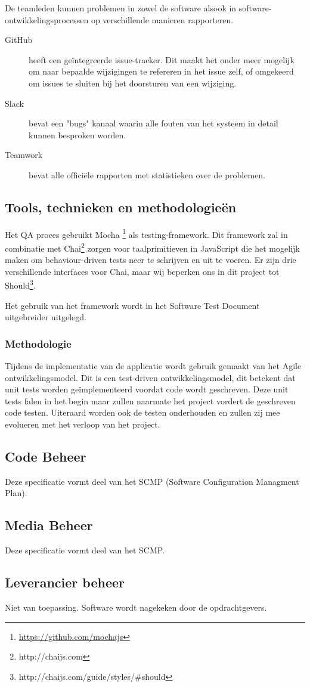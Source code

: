 De teamleden kunnen problemen in zowel de software alsook in software-ontwikkelingsprocessen op verschillende manieren rapporteren.
\begin{description}
\item[GitHub] heeft een geïntegreerde issue-tracker. Dit maakt het onder meer mogelijk om naar bepaalde wijzigingen te refereren in het issue zelf, of omgekeerd om issues te sluiten bij het doorsturen van een wijziging.
\item[Slack] bevat een "bugs" kanaal waarin alle fouten van het systeem in detail kunnen besproken worden.
\item[Teamwork] bevat alle officiële rapporten met statistieken over de problemen.
\end{description}

\subsection{Tools, technieken en methodologieën}

Het QA proces gebruikt Mocha \footnote{\url{https://github.com/mochajs}} als testing-framework. Dit framework zal in combinatie met Chai\footnote{http://chaijs.com} zorgen voor taalprimitieven in JavaScript die het mogelijk maken om behaviour-driven tests neer te schrijven en uit te voeren. Er zijn drie verschillende interfaces voor Chai, maar wij beperken ons in dit project tot Should\footnote{http://chaijs.com/guide/styles/\#should}.\newline

Het gebruik van het framework wordt in het Software Test Document uitgebreider uitgelegd.

\subsubsection{Methodologie}

Tijdens de implementatie van de applicatie wordt gebruik gemaakt van het Agile ontwikkelingsmodel. Dit is een test-driven ontwikkelingsmodel, dit betekent dat unit tests worden geïmplementeerd voordat code wordt geschreven. Deze unit tests falen in het begin maar zullen naarmate het project vordert de geschreven code testen. Uiteraard worden ook de testen onderhouden en zullen zij mee evolueren met het verloop van het project.

\subsection{Code Beheer}

Deze specificatie vormt deel van het SCMP (Software Configuration Managment Plan).

\subsection{Media Beheer}

Deze specificatie vormt deel van het SCMP.

\subsection{Leverancier beheer}

Niet van toepassing. Software wordt nagekeken door de opdrachtgevers.